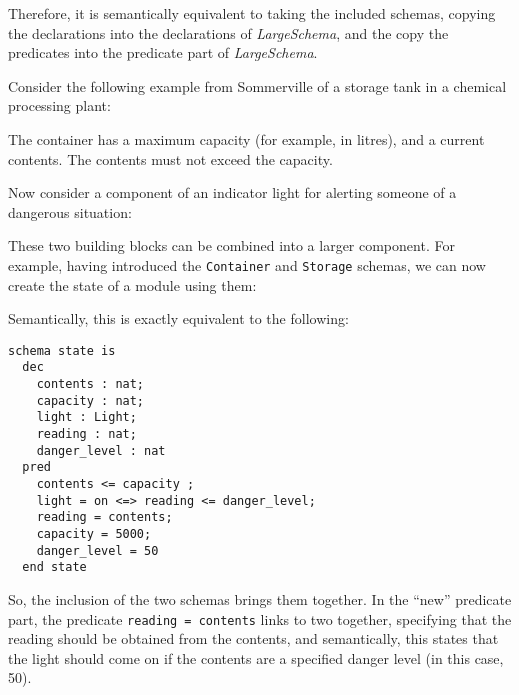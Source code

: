 Therefore, it is semantically equivalent to taking the included schemas, copying the declarations into the declarations of \emph{LargeSchema}, and the copy the predicates into the predicate part of \emph{LargeSchema}.

\begin{example}
Consider the following example from Sommerville \cite{sommerville10} of a storage tank in a chemical processing plant:





The container has a maximum capacity (for example, in litres), and a current contents. The contents must not exceed the capacity.

Now consider a component of an indicator light for alerting someone of a dangerous situation:




These two building blocks can be combined into a larger component. For example, having introduced the \texttt{Container} and \texttt{Storage} schemas, we can now create the state of a module using them:



Semantically, this is exactly equivalent to the following:

\lstset{aboveskip=3mm}
\begin{lstlisting}[caption={The expanded version of the state schema for the \texttt{Storage} module}, label={listing:specification:storage-expanded}]
  schema state is
  dec   
    contents : nat;
    capacity : nat;
    light : Light;
    reading : nat;
    danger_level : nat
  pred
    contents <= capacity ;
    light = on <=> reading <= danger_level;
    reading = contents;
    capacity = 5000;
    danger_level = 50
  end state
\end{lstlisting}

So, the inclusion of the two schemas brings them together. In the ``new'' predicate part, the predicate \texttt{reading = contents} links to two together, specifying that the reading should be obtained from the contents, and semantically, this states that the light should come on if the contents are a specified danger level (in this case, 50).

\end{example}

